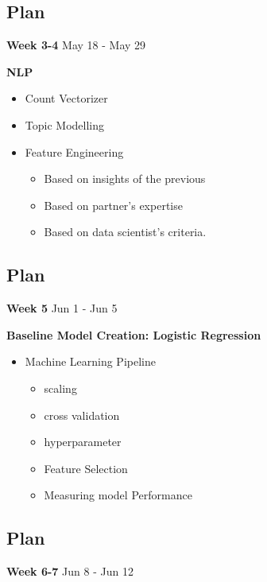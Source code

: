 \documentclass[
]{article}
\providecommand{\tightlist}{%
  \setlength{\itemsep}{0pt}\setlength{\parskip}{0pt}}
\begin{document}
\hypertarget{plan-2}{%
\subsection{Plan}\label{plan-2}}

\textbf{Week 3-4} May 18 - May 29

\textbf{NLP}

\begin{itemize}
\item
  Count Vectorizer
\item
  Topic Modelling
\item
  Feature Engineering

  \begin{itemize}
  \tightlist
  \item
    Based on insights of the previous
  \item
    Based on partner's expertise
  \item
    Based on data scientist's criteria.
  \end{itemize}
\end{itemize}

\hypertarget{plan-3}{%
\subsection{Plan}\label{plan-3}}

\textbf{Week 5} Jun 1 - Jun 5

\textbf{Baseline Model Creation: Logistic Regression}

\begin{itemize}
\tightlist
\item
  Machine Learning Pipeline

  \begin{itemize}
  \tightlist
  \item
    scaling
  \item
    cross validation
  \item
    hyperparameter
  \item
    Feature Selection
  \item
    Measuring model Performance
  \end{itemize}
\end{itemize}

\hypertarget{plan-4}{%
\subsection{Plan}\label{plan-4}}

\textbf{Week 6-7} Jun 8 - Jun 12
\end{document}
